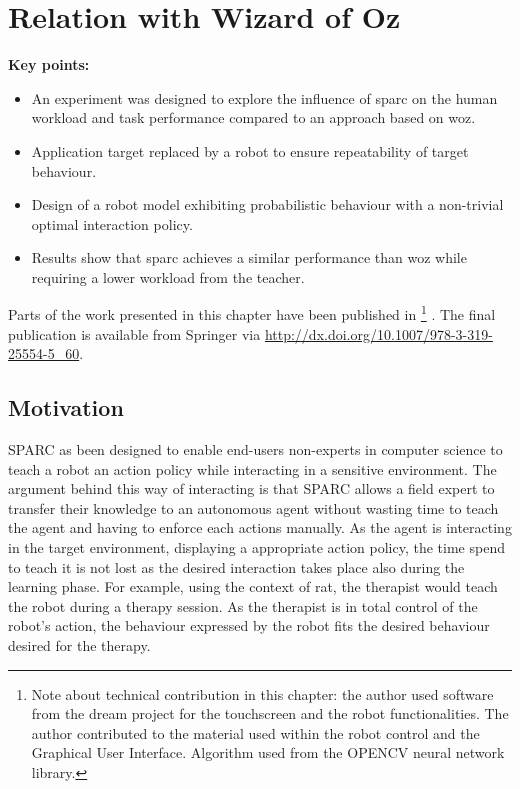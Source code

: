 \chapter{Relation with Wizard of Oz}\label{chap:woz}
\begin{framed}
	\textbf{Key points:}
	
	\begin{itemize}
		\item An experiment was designed to explore the influence of \gls{sparc} on the human workload and task performance compared to an approach based on \gls{woz}.
		\item Application target replaced by a robot to ensure repeatability of target behaviour.
		\item Design of a robot model exhibiting probabilistic behaviour with a non-trivial optimal interaction policy.
		\item Results show that \gls{sparc} achieves a similar performance than \gls{woz} while requiring a lower workload from the teacher.
	\end{itemize}
\end{framed}

Parts of the work presented in this chapter have been published in \cite{senft2015sparc} \footnote{Note about technical contribution in this chapter: the author used software from the \gls{dream} project for the touchscreen and the robot functionalities. The author contributed to the material used within the robot control and the Graphical User Interface. Algorithm used from the OPENCV neural network library.} . The final publication is available from Springer via \url{http://dx.doi.org/10.1007/978-3-319-25554-5_60}.

\newpage

\section{Motivation}

SPARC as been designed to enable end-users non-experts in computer science to teach a robot an action policy while interacting in a sensitive environment. The argument behind this way of interacting is that SPARC allows a field expert to transfer their knowledge to an autonomous agent without wasting time to teach the agent and having to enforce each actions manually. As the agent is interacting in the target environment, displaying a appropriate action policy, the time spend to teach it is not lost as the desired interaction takes place also during the learning phase. For example, using the context of \gls{rat}, the therapist would teach the robot during a therapy session. As the therapist is in total control of the robot's action, the behaviour expressed by the robot fits the desired behaviour desired for the therapy.

